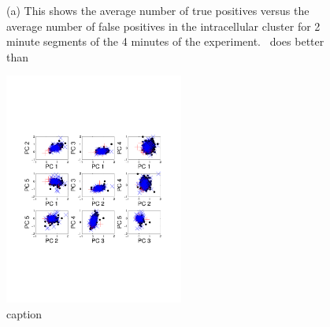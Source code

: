 
\begin{figure}[htbp]
	\centering
	\caption{(a) This shows the average number of true positives versus the average number of false positives in the intracellular cluster for 2 minute segments of the 4 minutes of the experiment.  \smug\ does better than     }
	\label{fig:pairs}
\end{figure}


\begin{figure}[htbp]
	\centering
		\includegraphics[height=3in]{../figs/new/pairs.pdf}
	\caption{caption}
	\label{fig:pairs}
\end{figure}
